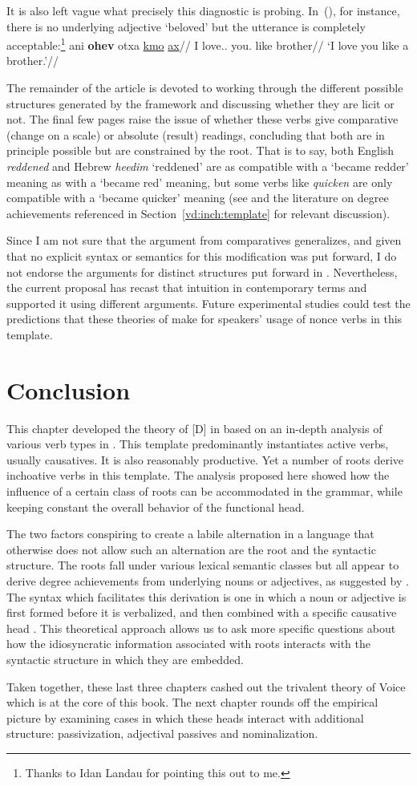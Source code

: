 It is also left vague what precisely this diagnostic is probing. In~(\nextx), for instance, there is no underlying adjective `beloved' but the utterance is completely acceptable:\footnote{Thanks to Idan Landau for pointing this out to me.}
\ex
	\begingl
	\gla ani \textbf{ohev} otxa \underline{kmo} \underline{ax}//
	\glb I love.. you. like brother//
	\glft `I love you like a brother.'//
	\endgl
\xe

The remainder of the article is devoted to working through the different possible structures generated by the framework and discussing whether they are licit or not. The final few pages \citep[150]{borer91} raise the issue of whether these verbs give comparative (change on a scale) or absolute (result) readings, concluding that both are in principle possible but are constrained by the root. That is to say, both English \emph{reddened} and Hebrew \emph{heedim} `reddened' are as compatible with a `became redder' meaning as with a `became red' meaning, but some verbs like \emph{quicken} are only compatible with a `became quicker' meaning (see \citealt[ch.~5]{bobaljik12} and the literature on degree achievements referenced in Section~\ref{vd:inch:template} for relevant discussion).

Since I am not sure that the argument from comparatives generalizes, and given that no explicit syntax or semantics for this modification was put forward, I do not endorse the arguments for distinct structures put forward in \cite{borer91}. Nevertheless, the current proposal has recast that intuition in contemporary terms and supported it using different arguments. Future experimental studies could test the predictions that these theories of {\thif} make for speakers' usage of nonce verbs in this template.


\section{Conclusion} \label{vd:sum}
This chapter developed the theory of [D] in {\vd} based on an in-depth analysis of various verb types in {\thif}. This template predominantly instantiates active verbs, usually causatives. It is also reasonably productive. Yet a number of roots derive inchoative verbs in this template. The analysis proposed here showed how the influence of a certain class of roots can be accommodated in the grammar, while keeping constant the overall behavior of the functional head.

The two factors conspiring to create a labile alternation in a language that otherwise does not allow such an alternation are the root and the syntactic structure. The roots fall under various lexical semantic classes but all appear to derive degree achievements from underlying nouns or adjectives, as suggested by \cite{lev16}. The syntax which facilitates this derivation is one in which a noun or adjective is first formed before it is verbalized, and then combined with a specific causative head {\vd}. This theoretical approach allows us to ask more specific questions about how the idiosyncratic information associated with roots interacts with the syntactic structure in which they are embedded.

Taken together, these last three chapters cashed out the trivalent theory of Voice which is at the core of this book. The next chapter rounds off the empirical picture by examining cases in which these heads interact with additional structure: passivization, adjectival passives and nominalization.